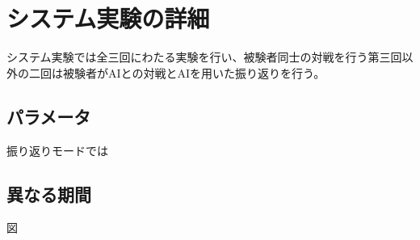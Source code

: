 \chapter{システム実験の詳細}
システム実験では全三回にわたる実験を行い、被験者同士の対戦を行う第三回以外の二回は被験者がAIとの対戦とAIを用いた振り返りを行う。
\section{パラメータ}
振り返りモードでは
\section{異なる期間}

図